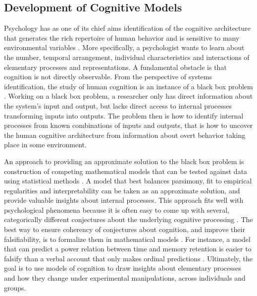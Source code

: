 \documentclass[12pt]{article}
\begin{document}
\subsection{Development of Cognitive Models}
Psychology has as one of its chief aims identification of the cognitive architecture that generates the rich repertoire of human behavior and is sensitive to many environmental variables \citep{AndBot2004,And2007}. More specifically, a psychologist wants to learn about the number, temporal arrangement, individual characteristics and interactions of elementary processes and representations. A fundamental obstacle is that cognition is not directly observable. From the perspective of systems identification, the study of human cognition is an instance of a black box problem \citep{Lju1999, Lju2010}. Working on a black box problem, a researcher only has direct information about the system’s input and output, but lacks direct access to internal processes transforming inputs into outputs. The problem then is how to identify internal processes from known combinations of inputs and outputs, that is how to uncover the human cognitive architecture from information about overt behavior taking place in some environment. 

	An approach to providing an approximate solution to the black box problem is construction of competing mathematical models that can be tested against data using statistical methods \citep{Lju1999,Lju2010,CasBer2002,GelCar2013}. A model that best balances parsimony, fit to empirical regularities and interpretability can be taken as an approximate solution, and provide valuable insights about internal processes. This approach fits well with psychological phenomena because it is often easy to come up with several, categorically different conjectures about the underlying cognitive processing \citep{TowAsh1983}. The best way to ensure coherency of conjectures about cognition, and improve their falsifiability, is to formalize them in mathematical models \citep{BusDie2010,LewFar2010,LeeWag2014}. For instance, a model that can predict a power relation between time and memory retention is easier to falsify than a verbal account that only makes ordinal predictions \citep{CavMyu2013}. Ultimately, the goal is to use models of cognition to draw insights about elementary processes and how they change under experimental manipulations, across individuals and groups.
    
\end{document}
